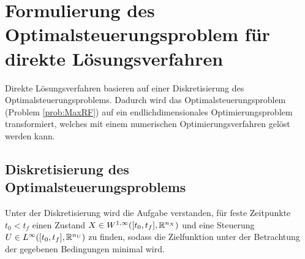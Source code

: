 \chapter{Formulierung des Optimalsteuerungsproblem für direkte Lösungsverfahren} \label{cha:direct}

Direkte Lösungsverfahren basieren auf einer Diskretisierung des Optimalsteuerungsproblems. Dadurch wird das Optimalsteuerungsproblem (Problem \ref{prob:MaxRF}) auf ein endlichdimensionales Optimierungsproblem transformiert, welches mit einem numerischen Optimierungsverfahren gelöst werden kann.












\section{Diskretisierung des Optimalsteuerungsproblems}
Unter der Diskretisierung wird die Aufgabe verstanden, für feste Zeitpunkte $t_0 < t_f$ einen Zustand $X \in W^{1, \infty} ([t_0,t_f], \mathbb{R}^{n_X})$ und eine Steuerung $U \in L^{\infty} ([t_0,t_f], \mathbb{R}^{n_U})$ zu finden, sodass die Zielfunktion unter der Betrachtung der gegebenen Bedingungen minimal wird.

